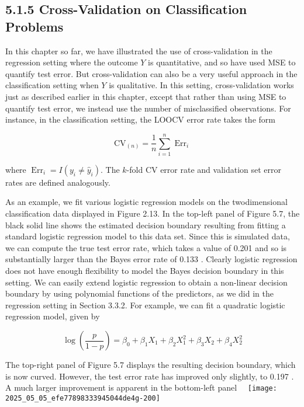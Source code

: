 \documentclass[10pt]{article}
\begin{document}
\subsection*{5.1.5 Cross-Validation on Classification Problems}
In this chapter so far, we have illustrated the use of cross-validation in the regression setting where the outcome $Y$ is quantitative, and so have used MSE to quantify test error. But cross-validation can also be a very useful approach in the classification setting when $Y$ is qualitative. In this setting, cross-validation works just as described earlier in this chapter, except that rather than using MSE to quantify test error, we instead use the number of misclassified observations. For instance, in the classification setting, the LOOCV error rate takes the form


\begin{equation*}
\mathrm{CV}_{(n)}=\frac{1}{n} \sum_{i=1}^{n} \operatorname{Err}_{i} \tag{5.4}
\end{equation*}


where $\operatorname{Err}_{i}=I\left(y_{i} \neq \hat{y}_{i}\right)$. The $k$-fold CV error rate and validation set error rates are defined analogously.

As an example, we fit various logistic regression models on the twodimensional classification data displayed in Figure 2.13. In the top-left panel of Figure 5.7, the black solid line shows the estimated decision boundary resulting from fitting a standard logistic regression model to this data set. Since this is simulated data, we can compute the true test error rate, which takes a value of 0.201 and so is substantially larger than the Bayes error rate of 0.133 . Clearly logistic regression does not have enough flexibility to model the Bayes decision boundary in this setting. We can easily extend logistic regression to obtain a non-linear decision boundary by using polynomial functions of the predictors, as we did in the regression setting in Section 3.3.2. For example, we can fit a quadratic logistic regression model, given by


\begin{equation*}
\log \left(\frac{p}{1-p}\right)=\beta_{0}+\beta_{1} X_{1}+\beta_{2} X_{1}^{2}+\beta_{3} X_{2}+\beta_{4} X_{2}^{2} \tag{5.5}
\end{equation*}


The top-right panel of Figure 5.7 displays the resulting decision boundary, which is now curved. However, the test error rate has improved only slightly, to 0.197 . A much larger improvement is apparent in the bottom-left panel\
\
\texttt{[image: 2025\_05\_05\_efe77898333945044de4g-200]}
\end{document}
